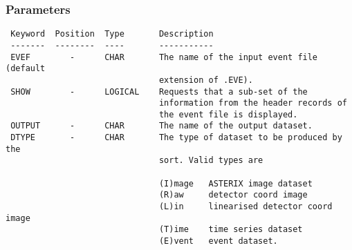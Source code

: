 \documentclass{book}
\renewcommand{\_}{{\tt\char'137}}     %
\begin{document}
\subsubsection{Parameters}
\begin{verbatim}
 Keyword  Position  Type       Description
 -------  --------  ----       -----------
 EVEF        -      CHAR       The name of the input event file (default
                               extension of .EVE).
 SHOW        -      LOGICAL    Requests that a sub-set of the
                               information from the header records of
                               the event file is displayed.
 OUTPUT      -      CHAR       The name of the output dataset.
 DTYPE       -      CHAR       The type of dataset to be produced by the
                               sort. Valid types are

                               (I)mage   ASTERIX image dataset
                               (R)aw     detector coord image
                               (L)in     linearised detector coord image
                               (T)ime    time series dataset
                               (E)vent   event dataset.


\end{verbatim}
\end{document}
